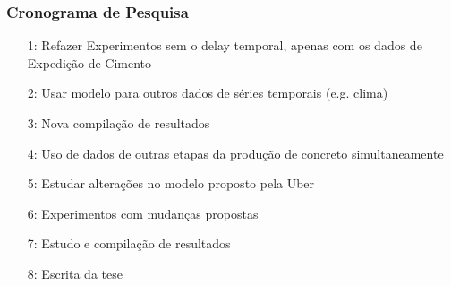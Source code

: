 \documentclass{beamer}
\begin{document}
\begin{frame}
  \frametitle{Cronograma de Pesquisa}
\begin{itemize}

\item[1: ] Refazer Experimentos sem o delay temporal, apenas com os dados
  de Expedição de Cimento
\item[2: ] Usar modelo para outros dados de séries temporais (e.g. clima)
\item[3: ] Nova compilação de resultados
\item[4: ] Uso de dados de outras etapas da produção de concreto simultaneamente
\item[5: ] Estudar alterações no modelo proposto pela Uber  
\item[6: ] Experimentos com mudanças propostas 
\item[7: ] Estudo e compilação de resultados
\item[8: ] Escrita da tese 


  
\end{itemize}

\end{frame}
\end{document}
